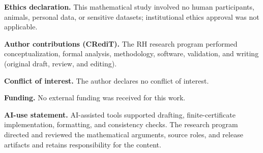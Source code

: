 \documentclass[11pt]{article}
\theoremstyle{definition}
\theoremstyle{remark}
\begin{document}
\noindent\textbf{Ethics declaration.}
This mathematical study involved no human participants, animals, personal
data, or sensitive datasets; institutional ethics approval was not
applicable.

\noindent\textbf{Author contributions (CRediT).}
The RH research program performed conceptualization, formal analysis,
methodology, software, validation, and writing (original draft, review,
and editing).

\noindent\textbf{Conflict of interest.}
The author declares no conflict of interest.

\noindent\textbf{Funding.}
No external funding was received for this work.

\noindent\textbf{AI-use statement.}
AI-assisted tools supported drafting, finite-certificate implementation,
formatting, and consistency checks.  The research program directed and
reviewed the mathematical arguments, source roles, and release artifacts
and retains responsibility for the content.

\begingroup
\sloppy
\raggedright


\endgroup
\end{document}
